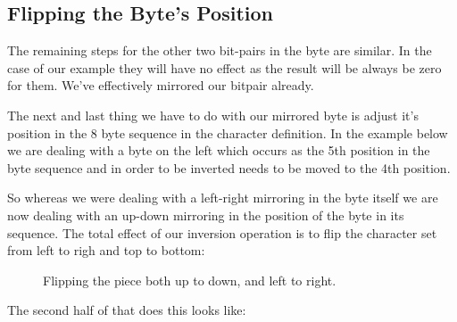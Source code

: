 \subsection{Flipping the Byte's Position}
The remaining steps for the other two bit-pairs in the byte are similar. In the case of our
example they will have no effect as the result will be always be zero for them. We've
effectively mirrored our bitpair already.

The next and last thing we have to do with our mirrored byte is adjust it's position in the 8 byte sequence
in the character definition. In the example below we are dealing with a byte on
the left which occurs as the 5th position in the byte sequence and in order to be
inverted needs to be moved to the 4th position.

So whereas we were dealing with a left-right mirroring in the byte itself we are now dealing with an up-down
mirroring in the position of the byte in its sequence. The total effect of our inversion operation is
to flip the character set from left to righ and top to bottom:

\begin{figure}[H]
{
  \setlength{\tabcolsep}{3.0pt}
  \setlength\cmidrulewidth{\heavyrulewidth} %
    \begin{adjustbox}{width=10cm,center}
  \begin{subfigure}{0.3\textwidth}
  
  \end{subfigure}
  \begin{subfigure}{0.3\textwidth}
  
  \end{subfigure}
  \end{adjustbox}
}\caption[]{Flipping the piece both up to down, and left to right.}
\end{figure}

The second half of  that does this looks like:

